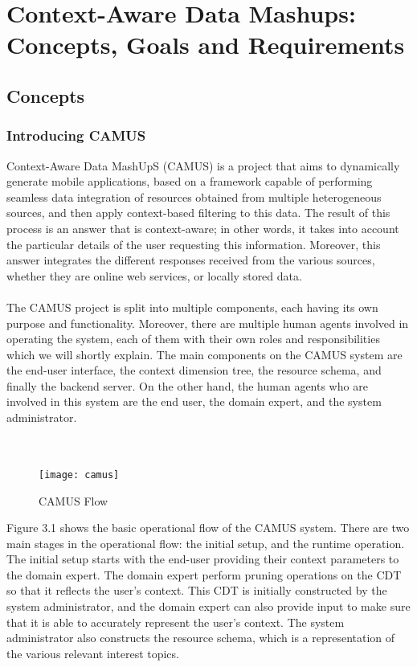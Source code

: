 \chapter{Context-Aware Data Mashups: Concepts, Goals and Requirements}
\label{capitolo3}
\thispagestyle{empty}

\section{Concepts}
\subsection{Introducing CAMUS}
Context-Aware Data MashUpS (CAMUS)\cite{camus} is a project that aims to dynamically generate mobile applications, based on a framework capable of performing seamless data integration of resources obtained from multiple heterogeneous sources, and then apply context-based filtering to this data. The result of this process is an answer that is context-aware; in other words, it takes into account the particular details of the user requesting this information. Moreover, this answer integrates the different responses received from the various sources, whether they are online web services, or locally stored data.\\\\
The CAMUS project is split into multiple components, each having its own purpose and functionality. Moreover, there are multiple human agents involved in operating the system, each of them with their own roles and responsibilities which we will shortly explain. The main components on the CAMUS system are the end-user interface, the context dimension tree, the resource schema, and finally the backend server. On the other hand, the human agents who are involved in this system are the end user, the domain expert, and the system administrator.\\\\\\
\begin{figure}[h]
\texttt{[image: camus]}
\caption{CAMUS Flow}
\end{figure}
\noindent Figure 3.1 shows the basic operational flow of the CAMUS system. There are two main stages in the operational flow: the initial setup, and the runtime operation. The initial setup starts with the end-user providing their context parameters to the domain expert. The domain expert perform pruning operations on the CDT so that it reflects the user's context. This CDT is initially constructed by the system administrator, and the domain expert can also provide input to make sure that it is able to accurately represent the user's context. The system administrator also constructs the resource schema, which is a representation of the various relevant interest topics.\\\\
